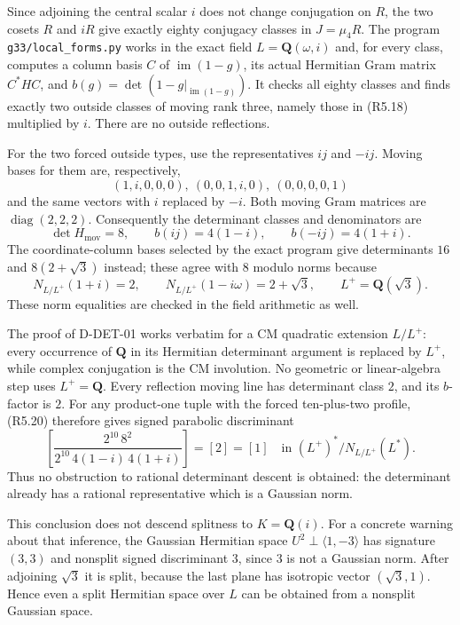 Since adjoining the central scalar $i$ does not change conjugation
on $R$, the two cosets $R$ and $iR$ give exactly eighty conjugacy
classes in $J=\mu_4R$.  The program \texttt{g33/local\_forms.py}
works in the exact field $L=\mathbf Q(\omega,i)$ and, for every
class, computes a column basis $C$ of $\operatorname{im}(1-g)$,
its actual Hermitian Gram matrix $C^*HC$, and
$b(g)=\det(1-g|_{\operatorname{im}(1-g)})$.
It checks all eighty classes and finds exactly two outside classes
of moving rank three, namely those in (R5.18) multiplied by $i$.
There are no outside reflections.

For the two forced outside types, use the representatives $ij$ and
$-ij$.  Moving bases for them are, respectively,
\[
 (1,i,0,0,0),\ (0,0,1,i,0),\ (0,0,0,0,1)
\]
and the same vectors with $i$ replaced by $-i$.
Both moving Gram matrices are $\operatorname{diag}(2,2,2)$.
Consequently the determinant classes and denominators are
\[
 \det H_{\mathrm{mov}}=8,\qquad
 b(ij)=4(1-i),\qquad b(-ij)=4(1+i).
                                                               \tag{R5.20}
\]
The coordinate-column bases selected by the exact program give
determinants $16$ and $8(2+\sqrt3)$ instead; these agree with $8$
modulo norms because
\[
 N_{L/L^+}(1+i)=2,\qquad
 N_{L/L^+}(1-i\omega)=2+\sqrt3,
 \qquad L^+=\mathbf Q(\sqrt3).
\]
These norm equalities are checked in the field arithmetic as well.

The proof of D-DET-01 works verbatim for a CM quadratic extension
$L/L^+$: every occurrence of $\mathbf Q$ in its Hermitian determinant
argument is replaced by $L^+$, while complex conjugation is the CM
involution.  No geometric or linear-algebra step uses $L^+=\mathbf Q$.
Every reflection moving line has determinant class $2$, and its
$b$-factor is $2$.  For any product-one tuple with the forced
ten-plus-two profile, (R5.20) therefore gives signed parabolic
discriminant
\[
 \left[
 \frac{2^{10}\,8^2}
      {2^{10}\,4(1-i)\,4(1+i)}
 \right]
                  =[2]=[1]
             \quad\text{in }(L^+)^*/N_{L/L^+}(L^*).
                                                               \tag{R5.21}
\]
Thus no obstruction to rational determinant descent is obtained:
the determinant already has a rational representative which is a
Gaussian norm.

This conclusion does not descend splitness to $K=\mathbf Q(i)$.
For a concrete warning about that inference, the Gaussian Hermitian
space $U^2\perp\langle1,-3\rangle$ has signature $(3,3)$ and
nonsplit signed discriminant $3$, since $3$ is not a Gaussian norm.
After adjoining $\sqrt3$ it is split, because the last plane has
isotropic vector $(\sqrt3,1)$.  Hence even a split Hermitian space
over $L$ can be obtained from a nonsplit Gaussian space.

